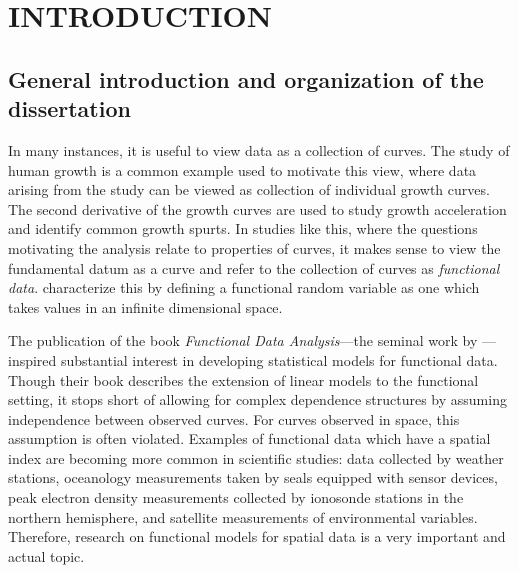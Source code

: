 
\chapter{INTRODUCTION}

\section{General introduction and organization of the dissertation}
In many instances, it is useful to view data as a collection of curves. The study of human growth is a common example used to motivate this view, where data arising from the study can be viewed as collection of individual growth curves.  The second derivative of the growth curves are used to study growth acceleration and identify common growth spurts. In studies like this, where the questions motivating the analysis relate to properties of curves, it makes sense to view the fundamental datum as a curve and refer to the collection of curves as \emph{functional data}.  \cite{ferraty2006nonparametric} characterize this by defining a functional random variable as one which takes values in an infinite dimensional space. 

The publication of the book \emph{Functional Data Analysis}---the seminal work by \cite{FDA}---inspired substantial interest in developing statistical models for functional data.  Though their book describes the extension of linear models to the functional setting, it stops short of allowing for complex dependence structures by assuming independence between observed curves. For curves observed in space, this assumption is often violated. Examples of functional data which have a spatial index are becoming more common in scientific studies: data collected by weather stations, oceanology measurements taken by seals equipped with sensor devices, peak electron density measurements collected by ionosonde stations in the northern hemisphere, and satellite measurements of environmental variables. Therefore,  research on functional models for spatial data is a very important and actual topic.

 

